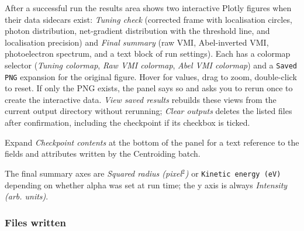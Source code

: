 \documentclass[11pt,a4paper]{article}
\newcommand{\code}[1]{\texttt{#1}}
\begin{document}
After a successful run the results area shows two interactive Plotly
figures when their data sidecars exist: \emph{Tuning check} (corrected frame
with localisation circles, photon distribution, net-gradient distribution
with the threshold line, and localisation precision) and \emph{Final
summary} (raw VMI, Abel-inverted VMI, photoelectron spectrum, and a text
block of run settings). Each has a colormap selector (\emph{Tuning
colormap}, \emph{Raw VMI colormap}, \emph{Abel VMI colormap}) and a
\code{Saved PNG} expansion for the original figure. Hover for values, drag
to zoom, double-click to reset. If only the PNG exists, the panel says so and
asks you to rerun once to create the interactive data. \emph{View saved
results} rebuilds these views from the current output directory without
rerunning; \emph{Clear outputs} deletes the listed files after confirmation,
including the checkpoint if its checkbox is ticked.

Expand \emph{Checkpoint contents} at the bottom of the panel for a text
reference to the fields and attributes written by the Centroiding batch.

The final summary axes are \emph{Squared radius (pixel$^2$)} or
\code{Kinetic energy (eV)} depending on whether alpha was set at run time; the
y axis is always \emph{Intensity (arb. units)}.

\subsubsection*{Files written}
\end{document}
